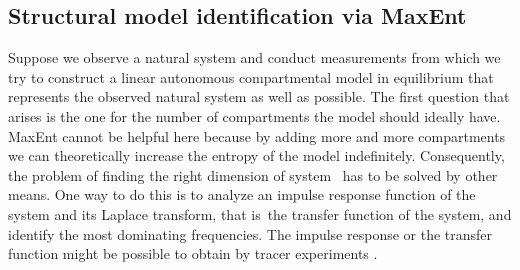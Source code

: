 \documentclass[smallextended]{svjour3}
\makeatletter
\renewcommand*{\eqref}[1]{%
  \hyperref[{#1}]{\textup{\tagform@{\ref*{#1}}}}%
}
\newcommand{\ie}{that is}
\makeatother
\begin{document}
\subsection{Structural model identification via MaxEnt}
Suppose we observe a natural system and conduct measurements from which we try to construct a linear autonomous compartmental model in equilibrium that represents the observed natural system as well as possible.
The first question that arises is the one for the number of compartments the model should ideally have.
MaxEnt cannot be helpful here because by adding more and more compartments we can theoretically increase the entropy of the model indefinitely.
Consequently, the problem of finding the right dimension of system~\eqref{eqn:lin_CS_sys} has to be solved by other means.
One way to do this is to analyze an impulse response function of the system and its Laplace transform, \ie\ the transfer function of the system, and identify the most dominating frequencies.
The impulse response or the transfer function might be possible to obtain by tracer experiments \citep{Anderson1983, Walter1986MBS}.
\end{document}
